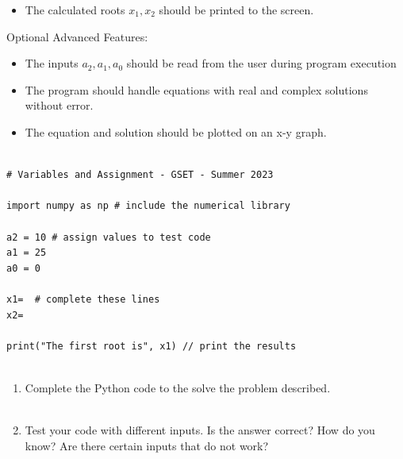 \documentclass[12pt]{article}
\begin{document}
\begin{description}[labelindent=1cm]
\begin{itemize}
	\item The calculated roots $x_1, x_2$ should be printed to the screen.

\end{itemize}	 
	Optional Advanced Features:
\begin{itemize}
	\item The inputs $a_2,a_1,a_0$ should be read from the user during program execution
		
	\item The program should handle equations with real and complex solutions without error. 
    
    \item The equation and solution should be plotted on an x-y graph.
    
\end{itemize}	
\newpage

\item[\textbf{\underline{Example Code:}}] \hfill \vspace{0mm}

	\begin{lstlisting}

# Variables and Assignment - GSET - Summer 2023 
	
import numpy as np # include the numerical library

a2 = 10 # assign values to test code
a1 = 25  
a0 = 0   

x1=  # complete these lines
x2=  

print("The first root is", x1) // print the results
	
	\end{lstlisting}
		


	\item[\textbf{\underline{Part 3 - Testing:}}] \hfill \vspace{0mm}
	\begin{enumerate}
	
		\item Complete the Python code to the solve the problem described. \\\\
		
		\item Test your code with different inputs. Is the answer correct? How do you know? Are there certain inputs that do not work? \\\\
		

\end{enumerate}
\end{description}
\end{document}
